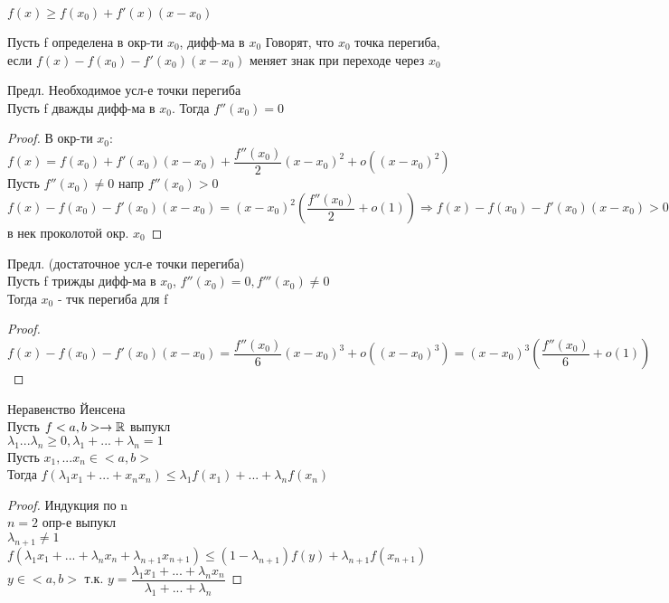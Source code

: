 $ f(x) \geq f(x_0) + f'(x) (x-x_0) $ \\
\begin{definition}
	Пусть f определена  в окр-ти $x_0$, дифф-ма в $x_0$ Говорят, что $x_0$  точка перегиба, если $ f(x) - f(x_0) - f'(x_0) (x-x_0) $ меняет знак при переходе через $x_0$ \\
\end{definition}
Предл. Необходимое усл-е точки перегиба \\
Пусть f дважды дифф-ма в $x_0$. Тогда $f''(x_0) = 0 $ \\
\begin{proof}
	В окр-ти $x_0$: \\
	$ f(x) = f(x_0) + f'(x_0)(x-x_0) + \dfrac{f''(x_0)}{2} (x - x_0)^2 + o((x-x_0)^2) $ \\
	Пусть $f''(x_0) \neq 0 $ напр $ f''(x_0) >0 $ \\
	$ f(x) - f(x_0) -f'(x_0)(x-x_0) = (x - x_0)^2 (\dfrac{f''(x_0)}{2} + o(1)) \Rightarrow f(x) - f(x_0) - f'(x_0) (x- x_0) > 0 $ в нек проколотой окр. $ x_0 $ 
\end{proof}
Предл. (достаточное усл-е точки перегиба) \\
Пусть f трижды дифф-ма в $ x_0 $, $f''(x_0) = 0, f'''(x_0) \neq 0 $ \\
Тогда $ x_0 $ - тчк перегиба для f \\
\begin{proof}
	$ f(x) - f(x_0) - f'(x_0) (x - x_0) = \dfrac{f''(x_0)}{6}(x- x_0)^3 + o((x - x_0)^3) = (x - x_0)^3 (\dfrac{f''(x_0)}{6} + o(1)) $ 
\end{proof}


\begin{theorem}
	Неравенство Йенсена \\
	Пусть $ f <a,b> \rightarrow \mathbb{R} $ выпукл \\
	$ \lambda_1 ... \lambda_n  \geq 0, \lambda_1 + ... + \lambda_n = 1 $ \\
	Пусть $ x_1, ... x_n \in <a,b> $ \\
	Тогда $ f(\lambda_1 x_1 + ... + x_nx_n) \leq \lambda_1f(x_1) + ... + \lambda_n f(x_n) $ \\
	\begin{proof}
		Индукция по n \\
		$ n = 2 $ опр-е выпукл \\
		$ \lambda_{n+1} \neq 1 $ \\
		$ f(\lambda_1x_1 + ... + \lambda_n x_n + \lambda_{n+1} x_{n+1}) \leq (1 - \lambda_{n+1}) f(y) + \lambda_{n+1} f(x_{n+1}) $ \\
		$ y \in <a,b> $ т.к. $ y = \dfrac{\lambda_1 x_1 + ... + \lambda_n x_n}{\lambda_1 + ... + \lambda_n} $ %
	\end{proof}
\end{theorem}

